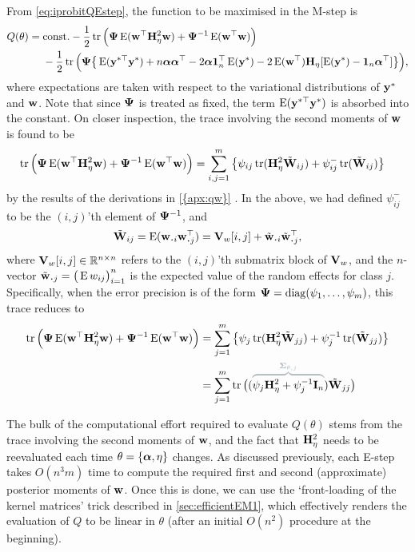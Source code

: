 From \cref{eq:iprobitQEstep}, the function to be maximised in the M-step is
\begin{align*}
  Q(\theta) 
  ={}& \text{const.}\hspace{0.01em} -\frac{1}{2}\operatorname{tr}\Big( {\bm\Psi} \operatorname{E}({\mathbf w}^\top{\mathbf H}_\eta^2{\mathbf w})  + {\bm\Psi}^{-1} \operatorname{E}({\mathbf w}^\top{\mathbf w}) \Big)  \nonumber \\
  &- \frac{1}{2} \operatorname{tr} \Big( 
  {\bm\Psi} \big\{
  \operatorname{E}({\mathbf y}^{*\top}{\mathbf y}^*)
  + n {\bm\alpha}{\bm\alpha}^\top 
  - 2{\bm\alpha} {\mathbf 1}_n^\top \operatorname{E}({\mathbf y}^*)
  - 2\operatorname{E}({\mathbf w}^\top){\mathbf H}_\eta [\operatorname{E}({\mathbf y}^*) - {\mathbf 1}_n{\bm\alpha}^\top] 
  \big\} \Big)
  ,
\end{align*}
where expectations are taken with respect to the variational distributions of ${\mathbf y}^*$ and ${\mathbf w}$. 
Note that since ${\bm\Psi}$ is treated as fixed, the term $\operatorname{E}({\mathbf y}^{*\top}{\mathbf y}^*)$ is absorbed into the constant.
On closer inspection, the trace involving the second moments of ${\mathbf w}$ is found to be
\begin{align*}
  \operatorname{tr} \Big( {\bm\Psi}\operatorname{E}({\mathbf w}^\top{\mathbf H}_\eta^2{\mathbf w})  + {\bm\Psi}^{-1} \operatorname{E}({\mathbf w}^\top{\mathbf w}) \Big)
  &= \sum_{i,j=1}^m \left\{ \psi_{ij} \operatorname{tr}({\mathbf H}_\eta^2\tilde{{\mathbf W}}_{ij}) + \psi_{ij}^- \operatorname{tr}(\tilde{{\mathbf W}}_{ij}) \right\}
\end{align*}
by the results of the derivations in \cref{{apx:qw}} .
In the above, we had defined $\psi_{ij}^-$ to be the $(i,j)$'th element of ${\bm\Psi}^{-1}$, and
\[
  \tilde\bW_{ij} 
  = \E(\bw_{\bigcdot i}\bw_{\bigcdot j}^\top)
  =  \bV_{w}[i,j] + \tilde\bw_{\bigcdot i} \tilde\bw_{\bigcdot j}^\top,
\]
where ${\mathbf V}_{w}[i,j] \in \mathbb{R}^{n\times n}$ refers to the $(i,j)$'th submatrix block of ${\mathbf V}_w$, and the $n$-vector $\tilde \bw_{\bigcdot j} = \big( \E w_{ij} \big)_{i=1}^n$ is the expected value of the random effects for class $j$.
Specifically, when the error precision is of the form ${\bm\Psi} = \operatorname{diag}(\psi_1,\dots,\psi_m)$, this trace reduces to
\vspace{-0.2em}
\begin{align*}
  \tr \Big( \bPsi\E(\bw^\top\bH_\eta^2\bw)  + \bPsi^{-1} \E(\bw^\top\bw) \Big)
  &= \sum_{j=1}^m \left\{ \psi_j \tr(\bH_\eta^2\tilde\bW_{jj}) + \psi_j^{-1} \tr(\tilde\bW_{jj}) \right\} \\
  &= \sum_{j=1}^m \tr\big( 
  (\greyoverbrace{\psi_j\bH_\eta^2 + \psi_j^{-1}\bI_n}{\bSigma_{\theta,j}}) 
  \tilde\bW_{jj} \big)
\end{align*}

\vspace{-1em}
The bulk of the computational effort required to evaluate $Q(\theta)$ stems from the trace involving the second moments of ${\mathbf w}$, and the fact that ${\mathbf H}_\eta^2$ needs to be reevaluated each time $\theta = \{{\bm\alpha},\eta\}$ changes.
As discussed previously, each E-step takes $O(n^3m)$ time to compute the required first and second (approximate) posterior moments of ${\mathbf w}$.
Once this is done, we can use the `front-loading of the kernel matrices' trick described in \cref{sec:efficientEM1}, which effectively renders the evaluation of $Q$ to be linear in $\theta$ (after an initial $O(n^2)$ procedure at the beginning).

